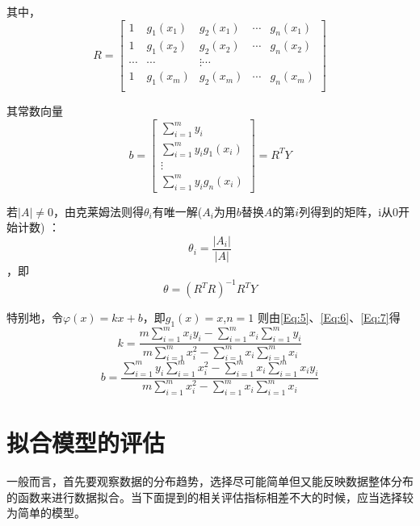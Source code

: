 \documentclass[withoutpreface]{cumcmthesis}
\begin{document}
其中，$$R=\begin{bmatrix}
    1 & g_1(x_1) & g_2(x_1) & \cdots & g_n(x_1)  \\ 
    1 & g_1(x_2) & g_2(x_2) & \cdots & g_n(x_2)  \\
    \cdots & \cdots &  \vdots \cdots \\ 
    1 & g_1(x_m) & g_2(x_m) & \cdots & g_n(x_m)  \\
\end{bmatrix}$$

其常数向量
\begin{equation}\label{Eq:6}
    b = \begin{bmatrix}
        \sum\limits_{i=1}^{m} y_i \\ 
        \sum\limits_{i=1}^{m} y_i g_1(x_i) \\ 
        \vdots \\ 
        \sum\limits_{i=1}^{m} y_i g_n(x_i)
    \end{bmatrix}=R^T Y
\end{equation}

若$|A|\ne 0$，由克莱姆法则得$\theta_i$有唯一解($A_i$为用$b$替换$A$的第$i$列得到的矩阵，i从0开始计数) ：
\begin{equation}\label{Eq:7}
    \theta_i = \frac{|A_i|}{|A|}
\end{equation}，即
\begin{equation}
    \theta = (R^TR)^{-1}R^TY
\end{equation}

特别地，令$\varphi(x) = kx+b$，即$g_1(x)=x$,$n=1$
则由\cref{Eq:5}、\cref{Eq:6}、\cref{Eq:7}得
\begin{equation}
    k = \frac{m \sum\limits_{i=1}^{m}x_i y_i - \sum\limits_{i=1}^{m} x_i\sum\limits_{i=1}^{m} y_i}{m \sum\limits_{i=1}^{m} x_i^2- \sum\limits_{i=1}^{m} x_i \sum\limits_{i=1}^{m} x_i}
\end{equation}
\begin{equation}
    b = \frac{\sum\limits_{i=1}^{m}y_i \sum\limits_{i=1}^{m}x_i^2-\sum\limits_{i=1}^{m} x_i \sum\limits_{i=1}^{m}x_i y_i}{m \sum\limits_{i=1}^{m} x_i^2- \sum\limits_{i=1}^{m} x_i \sum\limits_{i=1}^{m} x_i}
\end{equation}

\section{拟合模型的评估}

一般而言，首先要观察数据的分布趋势，选择尽可能简单但又能反映数据整体分布的函数来进行数据拟合。当下面提到的相关评估指标相差不大的时候，应当选择较为简单的模型。
\end{document}
